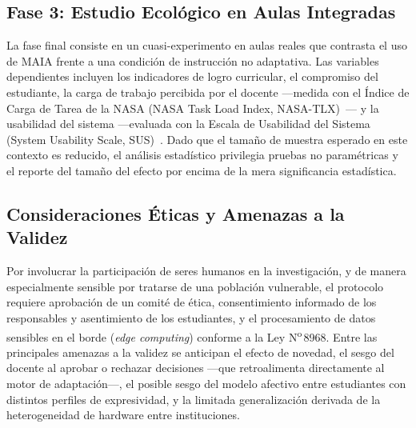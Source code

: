\subsection{Fase 3: Estudio Ecológico en Aulas Integradas}

La fase final consiste en un cuasi-experimento en aulas reales que contrasta el
uso de MAIA frente a una condición de instrucción no adaptativa. Las variables
dependientes incluyen los indicadores de logro curricular, el compromiso del
estudiante, la carga de trabajo percibida por el docente ---medida con el Índice
de Carga de Tarea de la NASA (NASA Task Load Index,
NASA-TLX)~\cite{HartStaveland1988}--- y la usabilidad del sistema ---evaluada con
la Escala de Usabilidad del Sistema (System Usability Scale,
SUS)~\cite{Brooke1996}. Dado que el tamaño de muestra esperado en este contexto
es reducido, el análisis estadístico privilegia pruebas no paramétricas y el
reporte del tamaño del efecto por encima de la mera significancia estadística.

\subsection{Consideraciones Éticas y Amenazas a la Validez}

Por involucrar la participación de seres humanos en la investigación, y de
manera especialmente sensible por tratarse de una población vulnerable, el
protocolo requiere aprobación de un comité de ética, consentimiento informado de
los responsables y asentimiento de los estudiantes, y el procesamiento de datos sensibles en el borde
(\textit{edge computing}) conforme a la Ley N\textsuperscript{o}\,8968. Entre las
principales amenazas a la validez se anticipan el efecto de novedad, el sesgo del
docente al aprobar o rechazar decisiones ---que retroalimenta directamente al
motor de adaptación---, el posible sesgo del modelo afectivo entre estudiantes
con distintos perfiles de expresividad, y la limitada generalización derivada de
la heterogeneidad de hardware entre instituciones.

